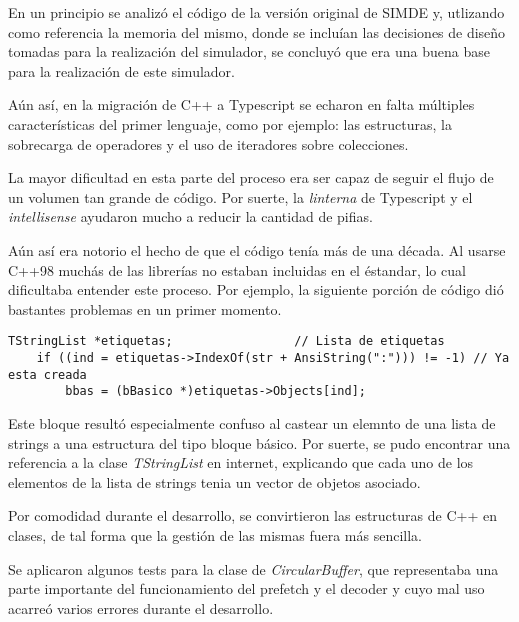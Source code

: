 En un principio se analizó el código de la versión original de SIMDE\cite{SIMDE} y, utlizando como
referencia la memoria del mismo, donde se incluían las decisiones de diseño
tomadas para la realización del simulador, se concluyó que era una buena base para la realización 
de este simulador.

\bigskip
Aún así, en la migración de C++ a Typescript se echaron en falta múltiples características del primer lenguaje,
como por ejemplo: las estructuras, la sobrecarga de operadores y el uso de iteradores sobre colecciones.

\bigskip
La mayor dificultad en esta parte del proceso era ser capaz de seguir el flujo de un volumen tan grande
de código. Por suerte, la \textit{linterna} de Typescript y el \textit{intellisense} ayudaron mucho a reducir la cantidad
de pifias.

\bigskip
Aún así era notorio el hecho de que el código tenía más de una década. Al usarse C++98 muchás de las librerías
no estaban incluidas en el éstandar, lo cual dificultaba entender este proceso. Por ejemplo, la siguiente
porción de código dió bastantes problemas en un primer momento.

\begin{lstlisting}
TStringList *etiquetas;                 // Lista de etiquetas
    if ((ind = etiquetas->IndexOf(str + AnsiString(":"))) != -1) // Ya esta creada
        bbas = (bBasico *)etiquetas->Objects[ind];
\end{lstlisting}

\bigskip
Este bloque resultó especialmente confuso al castear un elemnto de una lista de strings 
a una estructura del tipo bloque básico. Por suerte, se pudo encontrar una referencia 
a la clase \textit{TStringList} en internet, explicando que cada uno de los elementos de 
la lista de strings tenia un vector de objetos asociado. 

\bigskip
Por comodidad durante el desarrollo, se convirtieron las estructuras de C++ en clases, de tal forma
que la gestión de las mismas fuera más sencilla.

\bigskip
Se aplicaron algunos tests para la clase de \textit{CircularBuffer}, que representaba una parte importante
del funcionamiento del prefetch y el decoder y cuyo mal uso acarreó varios errores durante el desarrollo.